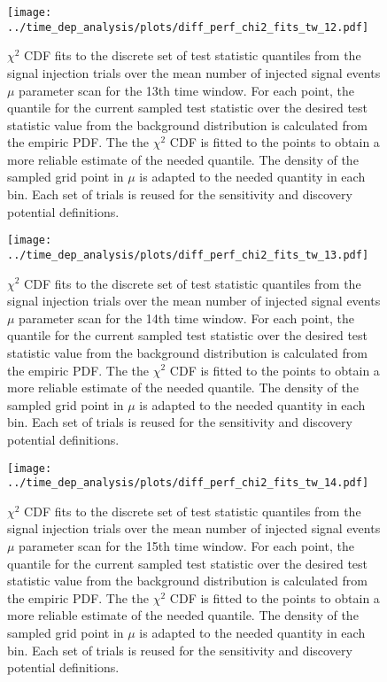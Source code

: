 \begin{figure}[H]
  \centering
  \texttt{[image: ../time\_dep\_analysis/plots/diff\_perf\_chi2\_fits\_tw\_12.pdf]}
  \caption[$\chi^2$ CDF fits for the 13th time window differential performance]{
     $\chi^2$ CDF fits to the discrete set of test statistic quantiles from the signal injection trials over the mean number of injected signal events $\mu$ parameter scan for the 13th time window.
     For each point, the quantile for the current sampled test statistic over the desired test statistic value from the background distribution is calculated from the empiric PDF.
     The the $\chi^2$ CDF is fitted to the points to obtain a more reliable estimate of the needed quantile.
     The density of the sampled grid point in $\mu$ is adapted to the needed quantity in each bin.
     Each set of trials is reused for the sensitivity and discovery potential definitions.
  }
  \label{fig:diff_perf_chi2_fits_tw_12}
\end{figure}
\begin{figure}[H]
  \centering
  \texttt{[image: ../time\_dep\_analysis/plots/diff\_perf\_chi2\_fits\_tw\_13.pdf]}
  \caption[$\chi^2$ CDF fits for the 14th time window differential performance]{
     $\chi^2$ CDF fits to the discrete set of test statistic quantiles from the signal injection trials over the mean number of injected signal events $\mu$ parameter scan for the 14th time window.
     For each point, the quantile for the current sampled test statistic over the desired test statistic value from the background distribution is calculated from the empiric PDF.
     The the $\chi^2$ CDF is fitted to the points to obtain a more reliable estimate of the needed quantile.
     The density of the sampled grid point in $\mu$ is adapted to the needed quantity in each bin.
     Each set of trials is reused for the sensitivity and discovery potential definitions.
  }
  \label{fig:diff_perf_chi2_fits_tw_13}
\end{figure}
\begin{figure}[H]
  \centering
  \texttt{[image: ../time\_dep\_analysis/plots/diff\_perf\_chi2\_fits\_tw\_14.pdf]}
  \caption[$\chi^2$ CDF fits for the 15th time window differential performance]{
     $\chi^2$ CDF fits to the discrete set of test statistic quantiles from the signal injection trials over the mean number of injected signal events $\mu$ parameter scan for the 15th time window.
     For each point, the quantile for the current sampled test statistic over the desired test statistic value from the background distribution is calculated from the empiric PDF.
     The the $\chi^2$ CDF is fitted to the points to obtain a more reliable estimate of the needed quantile.
     The density of the sampled grid point in $\mu$ is adapted to the needed quantity in each bin.
     Each set of trials is reused for the sensitivity and discovery potential definitions.
  }
  \label{fig:diff_perf_chi2_fits_tw_14}
\end{figure}
